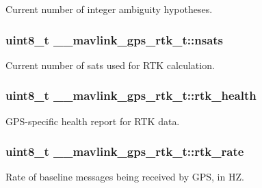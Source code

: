 Current number of integer ambiguity hypotheses. 

\hypertarget{struct____mavlink__gps__rtk__t_a2145b942317800aaba0b6d58745551c2}{
\subsubsection[{nsats}]{\setlength{\rightskip}{0pt plus 5cm}uint8\+\_\+t \+\_\+\+\_\+mavlink\+\_\+gps\+\_\+rtk\+\_\+t\+::nsats}}\label{struct____mavlink__gps__rtk__t_a2145b942317800aaba0b6d58745551c2}


Current number of sats used for R\+T\+K calculation. 

\hypertarget{struct____mavlink__gps__rtk__t_a72ee83d62b7f45e973224b274c13928f}{
\subsubsection[{rtk\+\_\+health}]{\setlength{\rightskip}{0pt plus 5cm}uint8\+\_\+t \+\_\+\+\_\+mavlink\+\_\+gps\+\_\+rtk\+\_\+t\+::rtk\+\_\+health}}\label{struct____mavlink__gps__rtk__t_a72ee83d62b7f45e973224b274c13928f}


G\+P\+S-\/specific health report for R\+T\+K data. 

\hypertarget{struct____mavlink__gps__rtk__t_a9dd843840b83bfd7dd0738cb1b691365}{
\subsubsection[{rtk\+\_\+rate}]{\setlength{\rightskip}{0pt plus 5cm}uint8\+\_\+t \+\_\+\+\_\+mavlink\+\_\+gps\+\_\+rtk\+\_\+t\+::rtk\+\_\+rate}}\label{struct____mavlink__gps__rtk__t_a9dd843840b83bfd7dd0738cb1b691365}


Rate of baseline messages being received by G\+P\+S, in H\+Z. 

